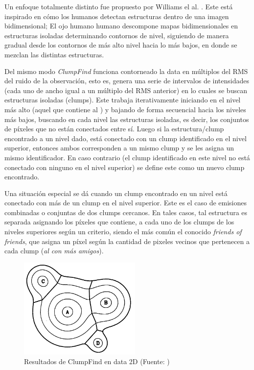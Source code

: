 \documentclass[letter, 11pt]{article}
\begin{document}
Un enfoque totalmente distinto fue propuesto por Williams el al. \cite{Williams}. Este está inspirado en cómo los humanos detectan estructuras dentro de una imagen bidimensional; El ojo humano humano descompone mapas bidimensionales en estructuras isoladas determinando contornos de nivel, siguiendo de manera gradual desde los contornos de más alto nivel hacia lo más bajos, en donde se mezclan las distintas estructuras.

Del mismo modo \textit{ClumpFind} funciona contorneado la data en múltiplos del RMS del ruido de la observación, esto es, genera una serie de intervalos de intensidades (cada uno de ancho igual a un múltiplo del RMS anterior) en lo cuales se buscan estructuras isoladas (clumps). Este trabaja iterativamente iniciando en el nivel más alto (aquel que contiene al ) y bajando de forma secuencial hacia los niveles más bajos, buscando en cada nivel las estructuras isoladas, es decir, los conjuntos de píxeles que no están conectados entre sí. Luego si la estructura/clump encontrado a un nivel dado, está conectado con un clump identificado en el nivel superior, entonces ambos corresponden a un mismo clump y se les asigna un mismo identificador. En caso contrario (el clump identificado en este nivel no está conectado con ninguno en el nivel superior) se define este como un nuevo clump encontrado.

Una situación especial se dá cuando un clump encontrado en un nivel está conectado con más de un clump en el nivel superior. Este es el caso de emisiones combinadas o conjuntas de dos clumps cercanos. En tales casos, tal estructura es separada asignando los píxeles que contiene, a cada uno de los clumps de los niveles superiores según un criterio, siendo el más común el conocido \textit{friends of friends}, que asigna un píxel según la cantidad de pixeles vecinos que pertenecen a cada clump (\textit{al con más amigos}).

\begin{figure}[htpb!]
\centering
\includegraphics[width=6cm]{cf}
\caption{Resultados de ClumpFind en data 2D (Fuente: \cite{Williams})}
\label{fig:cf}
\end{figure}
\end{document}
